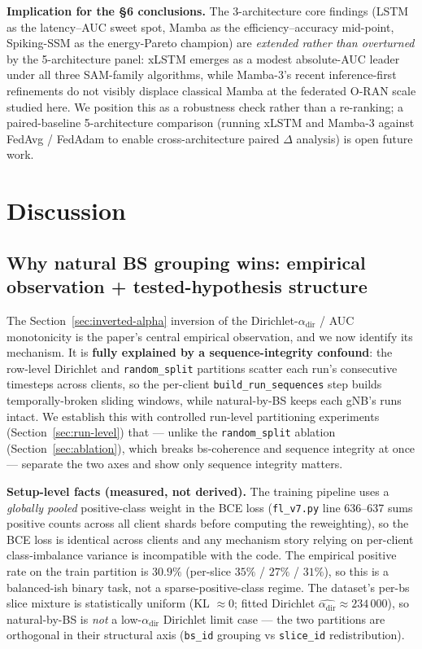 \documentclass[journal]{IEEEtran}
\newcommand{\alphadir}{\ensuremath{\alpha_{\mathrm{dir}}}}
\begin{document}
\textbf{Implication for the §6 conclusions.} The 3-architecture core findings (LSTM as the latency--AUC sweet spot, Mamba as the efficiency--accuracy mid-point, Spiking-SSM as the energy-Pareto champion) are \emph{extended rather than overturned} by the 5-architecture panel: xLSTM emerges as a modest absolute-AUC leader under all three SAM-family algorithms, while Mamba-3's recent inference-first refinements do not visibly displace classical Mamba at the federated O-RAN scale studied here. We position this as a robustness check rather than a re-ranking; a paired-baseline 5-architecture comparison (running xLSTM and Mamba-3 against FedAvg / FedAdam to enable cross-architecture paired $\Delta$ analysis) is open future work.


\section{Discussion}\label{sec:discussion}

\subsection{Why natural BS grouping wins: empirical observation + tested-hypothesis structure}\label{sec:why-heterogeneity-helps}

The Section~\ref{sec:inverted-alpha} inversion of the Dirichlet-$\alphadir$ / AUC monotonicity is the paper's central empirical observation, and we now identify its mechanism. It is \textbf{fully explained by a sequence-integrity confound}: the row-level Dirichlet and \lstinline|random_split| partitions scatter each run's consecutive timesteps across clients, so the per-client \lstinline|build_run_sequences| step builds temporally-broken sliding windows, while natural-by-BS keeps each gNB's runs intact. We establish this with controlled run-level partitioning experiments (Section~\ref{sec:run-level}) that --- unlike the \lstinline|random_split| ablation (Section~\ref{sec:ablation}), which breaks bs-coherence and sequence integrity at once --- separate the two axes and show only sequence integrity matters.

\textbf{Setup-level facts (measured, not derived).} The training pipeline uses a \emph{globally pooled} positive-class weight in the BCE loss (\lstinline|fl_v7.py| line 636--637 sums positive counts across all client shards before computing the reweighting), so the BCE loss is identical across clients and any mechanism story relying on per-client class-imbalance variance is incompatible with the code. The empirical positive rate on the train partition is $30.9\%$ (per-slice $35\%$ / $27\%$ / $31\%$), so this is a balanced-ish binary task, not a sparse-positive-class regime. The dataset's per-bs slice mixture is statistically uniform (KL $\approx 0$; fitted Dirichlet $\hat{\alphadir} \approx 234\,000$), so natural-by-BS is \emph{not} a low-$\alphadir$ Dirichlet limit case --- the two partitions are orthogonal in their structural axis (\lstinline|bs_id| grouping vs \lstinline|slice_id| redistribution).
\end{document}
